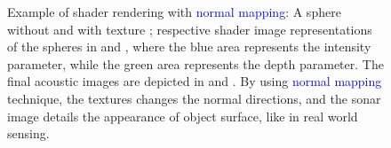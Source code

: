 \documentclass[final,5p,times]{elsarticle}
\begin{document}
\begin{figure}[!ht]
{        \label{fig:normal_5}
    }
    \captionsetup{justification=justified}
    \caption{Example of shader rendering with \textcolor{blue}{normal mapping}:
    A sphere without  and with texture
    ; respective shader image representations of the spheres
    in  and , where the blue area represents the
    intensity parameter, while the green area represents the depth parameter. The final acoustic
    images are depicted in  and . By using
    \textcolor{blue}{normal mapping} technique, the textures changes the normal directions,
    and the sonar image details the appearance of object surface, like
    in real world sensing.}
    \label{fig:sonar_normal_mapping}
\end{figure}
\end{document}
